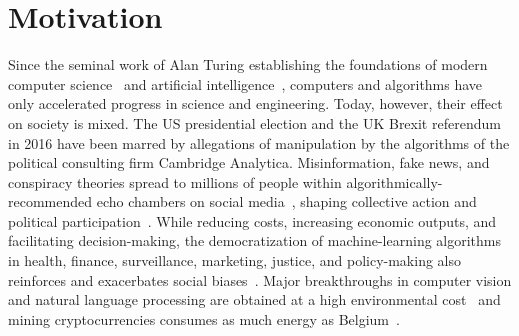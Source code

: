 \section{Motivation}
\label{in:sec:motivation}

Since the seminal work of Alan Turing establishing the foundations of modern computer science~\citep{turing1937computable} and artificial intelligence~\citep{turing2009computing}, computers and algorithms have only accelerated progress in science and engineering.
Today, however, their effect on society is mixed.
The US presidential election and the UK Brexit referendum in 2016 have been marred by allegations of manipulation by the algorithms of the political consulting firm Cambridge Analytica.
Misinformation, fake news, and conspiracy theories spread to millions of people within algorithmically-recommended echo chambers on social media~\citep{kumar2016disinformation,garimella2018political,ribeiro2020auditing,cinelli2021echo}, shaping collective action and political participation~\citep{margetts2015political}.
While reducing costs, increasing economic outputs, and facilitating decision-making, the democratization of machine-learning algorithms in health, finance, surveillance, marketing, justice, and policy-making also reinforces and exacerbates social biases~\citep{hajian2016algorithmic,stoica2018algorithmic,rodolfa2020case}.
Major breakthroughs in computer vision and natural language processing are obtained at a high environmental cost~\citep{strubell2019energy} and mining cryptocurrencies consumes as much energy as Belgium~\citep{gallersdorfer2020energy,de2020bitcoin}.

